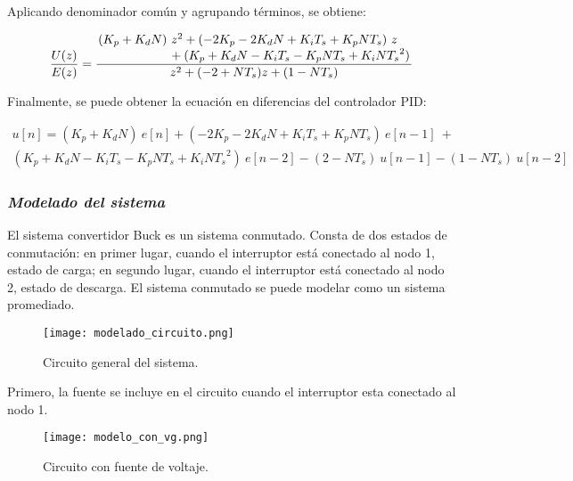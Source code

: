 Aplicando denominador común y agrupando términos, se obtiene:

\vspace{-0.5cm}
\begin{equation}
    \dfrac{U(z)}{E(z)} =
    \frac
    {
        \splitfrac{
            (K_p + K_d N)\ z^2 + (-2 K_p - 2 K_d N + K_i T_s + K_p N T_s)\ z
        }{
            + (K_p + K_d N - K_i T_s - K_p N T_s + K_i N {T_s}^2)
        }
    }
    {
            z^2 + (-2 + N T_s) z + (1 - N T_s)
    }
    \end{equation}
\vspace{-0.5cm}

Finalmente, se puede obtener la ecuación en diferencias del controlador PID:

\vspace{-0.5cm}
\begin{multline}
        u[n] = (K_p + K_d N)\ e[n] + (-2 K_p - 2 K_d N + K_i T_s + K_p N T_s)\ e[n-1]\  + \\
    (K_p + K_d N - K_i T_s - K_p N T_s + K_i N {T_s}^2)\ e[n-2] - (2 - N T_s)\ u[n-1] - (1 - N T_s)\ u[n-2]
\end{multline}
\vspace{-0.5cm}

\subsubsection*{\it{Modelado del sistema}}
\vspace{-0.25cm}

El sistema convertidor Buck es un sistema conmutado. Consta de dos estados de conmutación: 
en primer lugar, cuando el interruptor está conectado al nodo 1, estado de carga; en segundo lugar, cuando
el interruptor está conectado al nodo 2, estado de descarga.
El sistema conmutado se puede modelar como un sistema promediado.

\begin{figure}[H]
    \centering
    \texttt{[image: modelado\_circuito.png]}
    \vspace{-0.25cm}
    \caption{Circuito general del sistema.}
    \label{fig:modelado_circuito}
\end{figure}

Primero, la fuente se incluye en el circuito cuando el interruptor esta conectado al nodo 1.

\begin{figure}[H]
    \centering
    \texttt{[image: modelo\_con\_vg.png]}
    \vspace{-0.25cm}
    \caption{Circuito con fuente de voltaje.}
    \label{fig:modelado_con_vg}
\end{figure}

